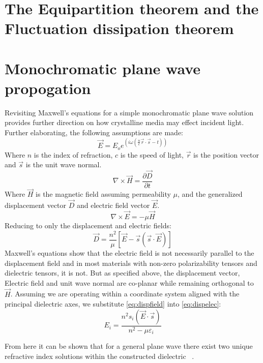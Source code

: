 \section{The Equipartition theorem and the Fluctuation dissipation theorem}


\section{Monochromatic plane wave propogation}
Revisiting Maxwell's equations for a simple monochromatic plane wave solution provides further direction on how crystalline media may effect incident light. Further elaborating, the following assumptions are made:
\begin{equation}
\vec{E} = E_o e^{(i \omega (\frac{n}{c} \vec{r}\cdot \vec{s}-t))}
\end{equation}
Where $n$ is the index of refraction, $c$ is the speed of light, $\vec{r}$ is the position vector and $\vec{s}$ is the unit wave normal.
\begin{equation}
\nabla \times \vec{H}= \frac{\partial \vec{D}}{\partial t}
\end{equation}
Where $\vec{H}$ is the magnetic field assuming permeability $\mu$, and the generalized displacement vector $\vec{D}$ and electric field vector $\vec{E}$.
\begin{equation}
\nabla \times \vec{E} = -\mu \vec{H}
\end{equation}
Reducing to only the displacement and electric fields:
\begin{equation}\label{eq:dispelec}
\vec{D} = \frac{n^2}{\mu}[\vec{E}-\vec{s}(\vec{s}\cdot \vec{E})]
\end{equation}
Maxwell's equations show that the electric field is not necessarily parallel to the displacement field and in most materials with non-zero polarizability tensors and dielectric tensors, it is not. But as specified above, the displacement vector, Electric field and unit wave normal are co-planar while remaining orthogonal to $\vec{H}$. Assuming we are operating within a coordinate system aligned with the principal dielectric axes, we substitute \autoref{eq:dispfield} into \autoref{eq:dispelec}:
\begin{equation}
E_i = \frac{n^2 s_i (\vec{E}\cdot\vec{s})}{n^2 - \mu \varepsilon_i}
\end{equation}

From here it can be shown that for a general plane wave there exist two unique refractive index solutions within the constructed dielectric ~\cite{nye}. 

